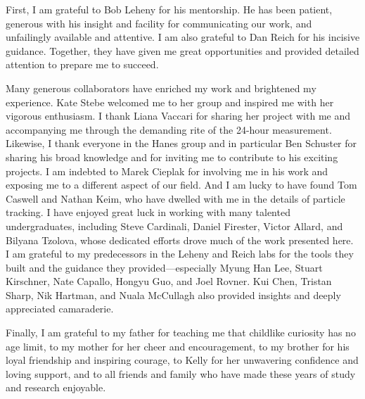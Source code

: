 \begin{frontmatter}
\begin{acknowledgment}
First, I am grateful to Bob Leheny for his mentorship. He has been patient, generous with his insight and facility for communicating our work, and unfailingly available and attentive. I am also grateful to Dan Reich for his incisive guidance. Together, they have given me great opportunities and provided detailed attention to prepare me to succeed.

Many generous collaborators have enriched my work and brightened my experience. Kate Stebe welcomed me to her group and inspired me with her vigorous enthusiasm. I thank Liana Vaccari for sharing her project with me and accompanying me through the demanding rite of the 24-hour measurement. Likewise, I thank everyone in the Hanes group and in particular Ben Schuster for sharing his broad knowledge and for inviting me to contribute to his exciting projects. I am indebted to Marek Cieplak for involving me in his work and exposing me to a different aspect of our field. And I am lucky to have found Tom Caswell and Nathan Keim, who have dwelled with me in the details of particle tracking. I have enjoyed great luck in working with many talented undergraduates, including Steve Cardinali, Daniel Firester, Victor Allard, and Bilyana Tzolova, whose dedicated efforts drove much of the work presented here. I am grateful to my predecessors in the Leheny and Reich labs for the tools they built and the guidance they provided---especially Myung Han Lee, Stuart Kirschner, Nate Capallo, Hongyu Guo, and Joel Rovner. Kui Chen, Tristan Sharp, Nik Hartman, and Nuala McCullagh also provided insights and deeply appreciated camaraderie.

Finally, I am grateful to my father for teaching me that childlike curiosity has no age limit, to my mother for her cheer and encouragement, to my brother for his loyal friendship and inspiring courage, to Kelly for her unwavering confidence and loving support, and to all friends and family who have made these years of study and research enjoyable.

\end{acknowledgment}

\tableofcontents



\end{frontmatter}
